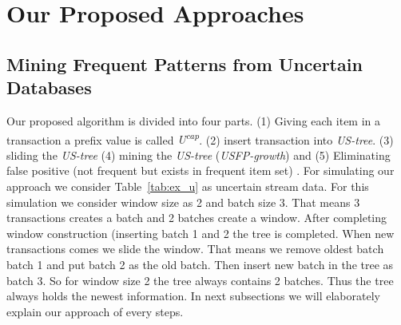 \documentclass[a4paper,12pt]{book}
\begin{document}
\chapter{Our Proposed Approaches}

\newpage


%
%
%
\newpage
\section{Mining Frequent Patterns from Uncertain Databases}
Our proposed algorithm is divided into four parts. (1) Giving each item in a transaction a prefix value is called \emph{U\textsuperscript{cap}}. (2) insert transaction into \emph {US-tree}. (3) sliding the \emph {US-tree} (4) mining the \emph {US-tree} (\emph{USFP-growth}) and (5) Eliminating false positive (not frequent but exists in frequent item set) . For simulating our approach we consider Table~\ref{tab:ex_u} as uncertain stream data. For this simulation we consider window size as 2 and batch size 3. That means 3 transactions creates a batch and 2 batches create a window. After completing window construction (inserting batch 1 and 2 the tree is completed. When new transactions comes we slide the window. That means we remove oldest batch batch 1 and put batch 2 as the old batch. Then insert new batch in the tree as batch 3. So for window size 2 the tree always contains 2 batches. Thus the tree always holds the newest information. In next subsections we will elaborately explain our approach of every steps.
\end{document}
